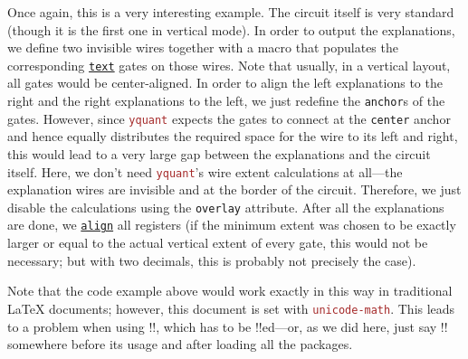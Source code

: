 \documentclass{scrartcl}
\makeatletter
\newenvironment{codeexample*}{%
   \VerbatimEnvironment%
   \let\FVB@VerbatimOut\minted@FVB@VerbatimOut
   \let\FVE@VerbatimOut\minted@FVE@VerbatimOut
   \minted@configlang{tex}%
   \minted@fvset
   \begin{VerbatimOut}[codes={\catcode`\^^I=12},firstline,lastline]{\minted@jobname.pyg}%
}{
   \end{VerbatimOut}%
   \minted@langlinenoson%
   \begin{adjustbox}{center}
       \minted@jobname.pyg %
   \end{adjustbox}\nopagebreak
   \expandafter\minted@pygmentize\expandafter{\minted@lang}%
   \minted@langlinenosoff%
   \par%
}
\def\pkg#1{\textcolor{brown}{\texttt{#1}}}
\def\gate#1{\hyperref[gate:#1]{\texttt{#1}}}
\def\Yquant{\pkg{yquant}}
\makeatother
\begin{document}
\begin{example}
\begin{codeexample*}
                  \end{codeexample*}
                  Once again, this is a very interesting example.
                  The circuit itself is very standard (though it is the first one in vertical mode).
                  In order to output the explanations, we define two invisible wires together with a macro that populates the corresponding \gate{text} gates on those wires.
                  Note that usually, in a vertical layout, all gates would be center\hyp aligned.
                  In order to align the left explanations to the right and the right explanations to the left, we just redefine the \texttt{anchor}s of the gates.
                  However, since \Yquant{} expects the gates to connect at the \texttt{center} anchor and hence equally distributes the required space for the wire to its left and right, this would lead to a very large gap between the explanations and the circuit itself.
                  Here, we don't need \Yquant's wire extent calculations at all---the explanation wires are invisible and at the border of the circuit.
                  Therefore, we just disable the calculations using the \texttt{overlay} attribute.
                  After all the explanations are done, we \gate{align} all registers (if the minimum extent was chosen to be exactly larger or equal to the actual vertical extent of every gate, this would not be necessary; but with two decimals, this is probably not precisely the case).

                  Note that the code example above would work exactly in this way in traditional \LaTeX{} documents; however, this document is set with \pkg{unicode-math}.
                  This leads to a problem when using \tex!\bmod!, which has to be \tex!\protect!ed---or, as we did here, just say \tex!\robustify\bmod! somewhere before its usage and after loading all the packages.
               \end{example}
            \endgroup

            \clearpage
\end{document}
